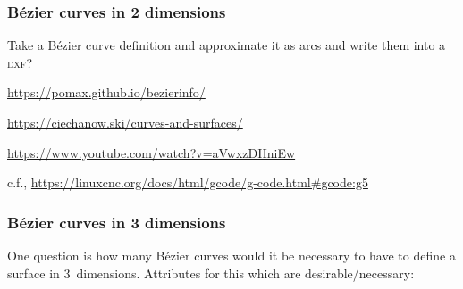 \documentclass{ltxdoc}
\begin{document}
\subsubsection*{Bézier curves in 2 dimensions}

Take a Bézier curve definition and approximate it as arcs and write them into a \textsc{dxf}?

\url{https://pomax.github.io/bezierinfo/}

\url{https://ciechanow.ski/curves-and-surfaces/}

\url{https://www.youtube.com/watch?v=aVwxzDHniEw}

c.f., \url{https://linuxcnc.org/docs/html/gcode/g-code.html#gcode:g5}

%
%
%
%
%
%
%
%

\subsubsection*{Bézier curves in 3 dimensions}
 
One question is how many Bézier curves would it be necessary to have to define a surface in 3~dimensions. Attributes for this which are desirable/necessary:
\end{document}
